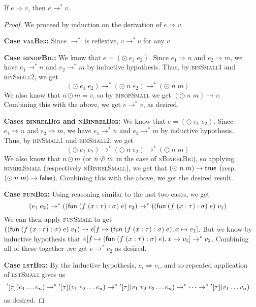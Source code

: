 \documentclass{homework}
\begin{document}
\begin{thm}
  If $e \Rightarrow v$, then $e \to^\ast v$.
\end{thm}
\begin{proof}
  We proceed by induction on the derivation of $e \Rightarrow v$.

  \vspace{0.5em}\noindent\textbf{Case \textsc{valBig}:}
  Since $\to^\ast$ is reflexive, $v \to^\ast v$ for any $v$.

  \vspace{0.5em}\noindent\textbf{Case \textsc{binopBig}:}
  We know that $e = (\odot\; e_1\; e_2)$.
  Since $e_1 \Rightarrow n$ and $e_2 \Rightarrow m$, we have $e_1 \to^\ast n$  and $e_2 \to^\ast m$ by inductive hypothesis.
  Thus, by \textsc{binSmall1} and \textsc{binSmall2}, we get
  $$(\odot\; e_1\; e_2) \to^\ast (\odot\; n\; e_2) \to^\ast (\odot\; n\; m)$$
  We also know that $n \odot m = v$, so by \textsc{binopSmall} we get $(\odot\; n\; m) \to v$.
  Combining this with the above, we get $e \to^\ast v$, as desired.

  \vspace{0.5em}\noindent\textbf{Cases \textsc{binrelBig} and \textsc{nBinrelBig}:}
  We know that $e = (\odot\; e_1\; e_2)$.
  Since $e_1 \Rightarrow n$ and $e_2 \Rightarrow m$, we have $e_1 \to^\ast n$  and $e_2 \to^\ast m$ by inductive hypothesis.
  Thus, by \textsc{binSmall1} and \textsc{binSmall2}, we get
  $$(\odot\; e_1\; e_2) \to^\ast (\odot\; n\; e_2) \to^\ast (\odot\; n\; m)$$
  We also know that $n \odot m$ (or $n \not\mathrel{\odot} m$ in the case of \textsc{nBinrelBig}), so applying \textsc{binrelSmall} (respectively \textsc{nBinrelSmall}), we get that $(\odot\; n\; m) \to \textsf{true}$ (resp. $(\odot\; n\; m) \to \textsf{false}$).
  Combining this with the above, we get the desired result.
  
  \vspace{0.5em}\noindent\textbf{Case \textsc{funBig}:}
  Using reasoning similar to the last two cases, we get
  $$(e_1\; e_2) \to^\ast ((\textsf{fun}\; (f\;(x : \tau) \mathrel{:} \sigma)\; e)\; e_2) \to^\ast ((\textsf{fun}\; (f\;(x : \tau) \mathrel{:} \sigma)\; e)\; v_1)$$
  We can then apply \textsc{funSmall} to get $((\textsf{fun}\; (f\;(x : \tau) \mathrel{:} \sigma)\; e)\; v_1) \to e [f \mapsto (\textsf{fun}\; (f\;(x : \tau) \mathrel{:} \sigma)\; e), x \mapsto v_1]$.
  But we know by inductive hypothesis that $e [f \mapsto (\textsf{fun}\; (f\;(x : \tau) \mathrel{:} \sigma)\; e), x \mapsto v_1] \to^\ast v_2$.
  Combining all of these together ,we get $e \to^\ast v_2$ as desired.

  \vspace{0.5em}\noindent\textbf{Case \textsc{lstBig}:}
  By the inductive hypothesis, $e_i \Rightarrow v_i$, and so repeated application of \textsc{lstSmall} gives us
  $${}'[\tau](e_1 \ldots e_n) \to^\ast {}'[\tau](v_1\; e_2 \ldots e_n) \to^\ast {}'[\tau](v_1\; v_2\; e_3 \ldots e_n) \to^\ast \cdots \to^\ast {}'[\tau](v_1 \ldots v_n)$$
  as desired.


\end{proof}
\end{document}
